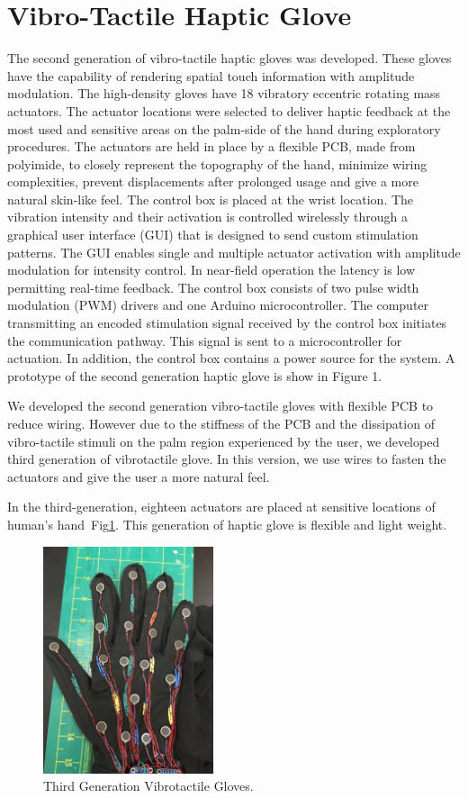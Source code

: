 \section{Vibro-Tactile Haptic Glove}
The second generation of vibro-tactile haptic gloves was developed. These gloves have the capability of rendering spatial touch information with amplitude modulation. The high-density gloves have 18 vibratory eccentric rotating mass actuators. The actuator locations were selected to deliver haptic feedback at the most used and sensitive areas on the palm-side of the hand during exploratory procedures. The actuators are held in place by a flexible PCB, made from polyimide, to closely represent the topography of the hand, minimize wiring complexities, prevent displacements after prolonged usage and give a more natural skin-like feel.
The control box is placed at the wrist location. The vibration
intensity and their activation is controlled wirelessly through a
graphical user interface (GUI) that is designed to send custom
stimulation patterns. The GUI enables single and multiple actuator
activation with amplitude modulation for intensity control. In near-field operation the latency is low permitting real-time feedback. The control box consists of two pulse width modulation (PWM) drivers and one Arduino microcontroller. The computer transmitting an encoded stimulation signal received by the control box initiates the communication pathway. This signal is sent to a microcontroller for actuation. In addition, the control box contains a power source for the system. A prototype of the second generation haptic glove is show in Figure 1.

We developed the second generation
vibro-tactile gloves with flexible PCB to reduce wiring. However due
to the stiffness of the PCB and the dissipation of vibro-tactile
stimuli on the palm region experienced by the user, we developed third
generation of vibrotactile glove. In this version, we use wires to
fasten the actuators and give the user a more natural feel.

In the third-generation, eighteen actuators are placed at sensitive
locations of human’s hand~Fig\ref{fig:glove}. This generation of haptic glove is flexible
and light weight.

\begin{figure}[!ht]
  \centering
  \includegraphics[width=5cm]{figures/figure1.jpg}
  \caption{Third Generation Vibrotactile Gloves.}
  \label{fig:glove}
\end{figure}

